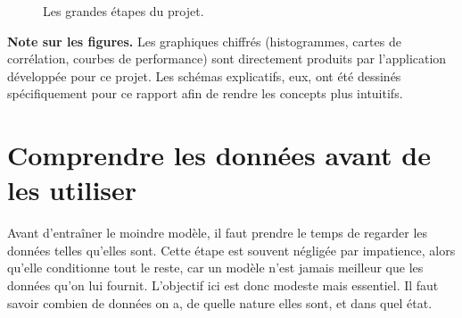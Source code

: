 \documentclass[12pt,oneside,noprintercorrection]{iut}
\begin{document}
\begin{figure}[H]
  \centering
  \caption{Les grandes étapes du projet.}
  \label{fig:pipeline}
\end{figure}

\medskip
\noindent\textbf{Note sur les figures.} Les graphiques chiffrés (histogrammes, cartes de
corrélation, courbes de performance) sont directement produits par l'application
développée pour ce projet. Les schémas explicatifs, eux, ont été dessinés
spécifiquement pour ce rapport afin de rendre les concepts plus intuitifs.

\chapter{Comprendre les données avant de les utiliser}

Avant d'entraîner le moindre modèle, il faut prendre le temps de regarder les
données telles qu'elles sont. Cette étape est souvent négligée par impatience, alors
qu'elle conditionne tout le reste, car un modèle n'est jamais meilleur que les données
qu'on lui fournit. L'objectif ici est donc modeste mais essentiel. Il faut savoir
combien de données on a, de quelle nature elles sont, et dans quel état.
\end{document}

